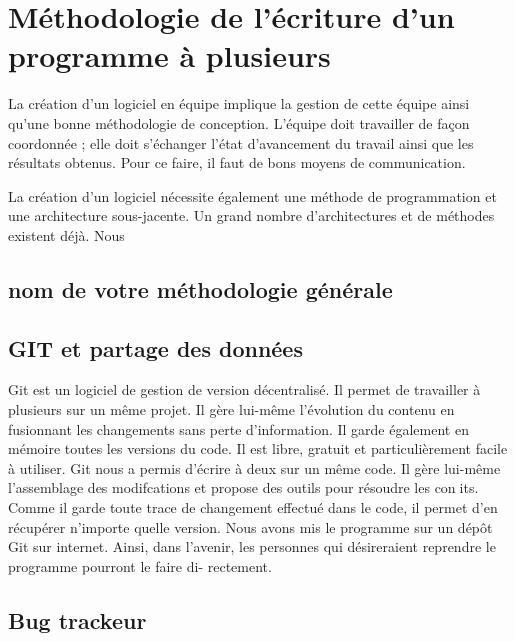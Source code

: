 \section{Méthodologie de l'écriture d'un programme à plusieurs}

La création d'un logiciel en équipe implique la gestion de cette équipe ainsi qu'une bonne méthodologie de conception.
L'équipe doit travailler de façon coordonnée ; elle doit s'échanger l'état
d'avancement du travail ainsi que les résultats obtenus. Pour ce faire, il faut
de bons moyens de communication.

La création d'un logiciel nécessite également une méthode de programmation et une architecture sous-jacente. 
Un grand nombre d'architectures et de méthodes existent déjà. Nous 


\subsection{nom de votre méthodologie générale}

\subsection{GIT et partage des données}

Git est un logiciel de gestion de version décentralisé. Il permet de
travailler à plusieurs sur un même projet. Il gère lui-même l'évolution du
contenu en fusionnant les changements sans perte d'information. Il garde
également en mémoire toutes les versions du code. Il est libre, gratuit et
particulièrement facile à utiliser.
Git nous a permis d'écrire à deux sur un même code. Il gère lui-même
l'assemblage des modifcations et propose des outils pour résoudre les conits.
Comme il garde toute trace de changement effectué dans le code, il permet
d'en récupérer n'importe quelle version.
Nous avons mis le programme sur un dépôt Git sur internet. Ainsi, dans l'avenir,
les personnes qui désireraient reprendre le programme pourront le faire di-
rectement.


\subsection{Bug trackeur}


